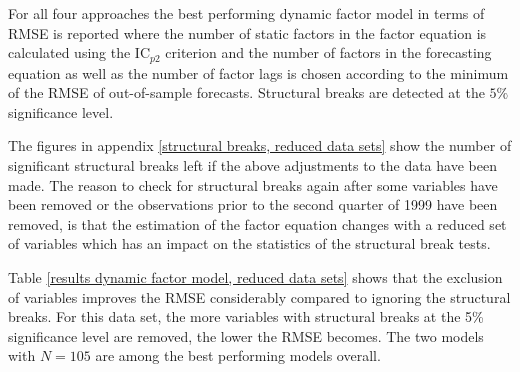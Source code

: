 \documentclass[12pt]{article}
\begin{document}
For all four approaches the best performing dynamic factor model in terms of RMSE is reported where the number of static factors in the factor equation is calculated using the IC$_{p2}$ criterion and the number of factors in the forecasting equation as well as the number of factor lags is chosen according to the minimum of the RMSE of out-of-sample forecasts. Structural breaks are detected at the $5\%$ significance level.

The figures in appendix \ref{structural breaks, reduced data sets} show the number of significant structural breaks left if the above adjustments to the data have been made. The reason to check for structural breaks again after some variables have been removed or the observations prior to the second quarter of 1999 have been removed, is that the estimation of the factor equation changes with a reduced set of variables which has an impact on the statistics of the structural break tests.

Table \ref{results dynamic factor model, reduced data sets} shows that the exclusion of variables improves the RMSE considerably compared to ignoring the structural breaks. For this data set, the more variables with structural breaks at the 5\% significance level are removed, the lower the RMSE becomes. The two models with $N=105$ are among the best performing models overall.
\end{document}
